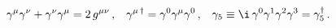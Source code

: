 \begin{equation}
\gamma^\mu\gamma^\nu + \gamma^\nu\gamma^\mu = 2\, g^{\mu\nu}\,, \;\;\;
\gamma^{\mu\,\dagger} = \gamma^0\gamma^\mu\gamma^0        \,, \;\;\;
\gamma_5 \equiv \i \,\gamma^0\gamma^1\gamma^2\gamma^3 =\gamma_5^\dagger\,.
\label{Diracmatrices}
\end{equation}

